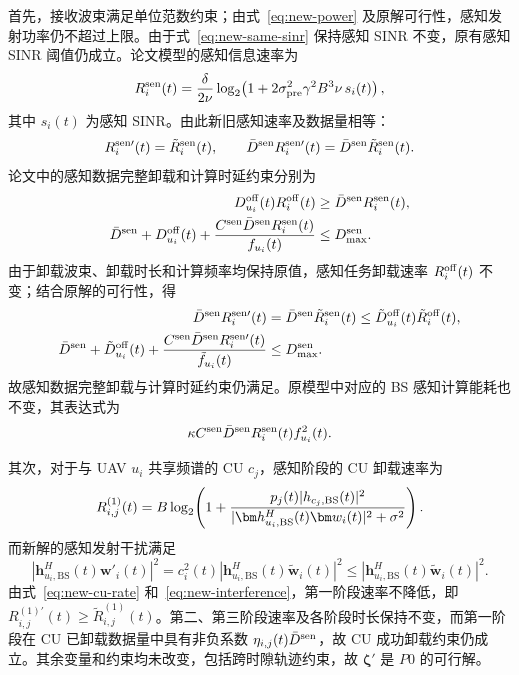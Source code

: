 首先，接收波束满足单位范数约束；由式~\eqref{eq:new-power} 及原解可行性，感知发射功率仍不超过上限。由于式~\eqref{eq:new-same-sinr} 保持感知 SINR 不变，原有感知 SINR 阈值仍成立。论文模型的感知信息速率为
\begin{equation}\label{eq:new-rate-formula}
R_i^{\rm sen}(t)=\frac{\delta}{2\nu}\log_2\!\left(1+2\sigma_{\rm pre}^2\gamma^2B^3\nu\,s_i(t)\right),
\end{equation}
其中 $s_i(t)$ 为感知 SINR。由此新旧感知速率及数据量相等：
\begin{equation}\label{eq:new-same-rate}
R_i^{\rm sen\prime}(t)=\tilde R_i^{\rm sen}(t),\qquad
\bar D^{\rm sen}R_i^{\rm sen\prime}(t)=\bar D^{\rm sen}\tilde R_i^{\rm sen}(t).
\end{equation}
论文中的感知数据完整卸载和计算时延约束分别为
\begin{align}\label{eq:new-model-off}
D_{u_i}^{\rm off}(t) R_i^{\rm off}(t)&\ge\bar D^{\rm sen}R_i^{\rm sen}(t),\\
\bar D^{\rm sen}+D_{u_i}^{\rm off}(t)+\frac{C^{\rm sen}\bar D^{\rm sen}R_i^{\rm sen}(t)}{f_{u_i}(t)}&\le D_{\max}^{\rm sen}.\label{eq:new-model-delay}
\end{align}
由于卸载波束、卸载时长和计算频率均保持原值，感知任务卸载速率 $R_i^{\rm off}(t)$ 不变；结合原解的可行性，得
\begin{align}
\bar D^{\rm sen}R_i^{\rm sen\prime}(t)&=\bar D^{\rm sen}\tilde R_i^{\rm sen}(t)\le\tilde D_{u_i}^{\rm off}(t)\tilde R_i^{\rm off}(t),\label{eq:new-off}\\
\bar D^{\rm sen}+\tilde D_{u_i}^{\rm off}(t)+\frac{C^{\rm sen}\bar D^{\rm sen}R_i^{\rm sen\prime}(t)}{\tilde f_{u_i}(t)}&\le D_{\max}^{\rm sen}.\label{eq:new-delay}
\end{align}
故感知数据完整卸载与计算时延约束仍满足。原模型中对应的 BS 感知计算能耗也不变，其表达式为
\[
\kappa C^{\rm sen}\bar D^{\rm sen}R_i^{\rm sen}(t) f_{u_i}^2(t).
\]

其次，对于与 UAV $u_i$ 共享频谱的 CU $c_j$，感知阶段的 CU 卸载速率为
\begin{equation}\label{eq:new-cu-rate}
R_{i,j}^{(1)}(t)=B\log_2\!\left(1+\frac{p_j(t)|h_{c_j,\rm BS}(t)|^2}{|\bm h_{u_i,\rm BS}^H(t)\bm w_i(t)|^2+\sigma^2}\right).
\end{equation}
而新解的感知发射干扰满足
\begin{equation}\label{eq:new-interference}
\left|\bm h_{u_i,\mathrm{BS}}^H(t)\bm w'_i(t)\right|^2=c_i^2(t)\left|\bm h_{u_i,\mathrm{BS}}^H(t)\tilde{\bm w}_i(t)\right|^2\le\left|\bm h_{u_i,\mathrm{BS}}^H(t)\tilde{\bm w}_i(t)\right|^2.
\end{equation}
由式~\eqref{eq:new-cu-rate} 和~\eqref{eq:new-interference}，第一阶段速率不降低，即 $R_{i,j}^{(1)\prime}(t)\ge\tilde R_{i,j}^{(1)}(t)$。第二、第三阶段速率及各阶段时长保持不变，而第一阶段在 CU 已卸载数据量中具有非负系数 $\eta_{i,j}(t)\bar D^{\rm sen}$，故 CU 成功卸载约束仍成立。其余变量和约束均未改变，包括跨时隙轨迹约束，故 $\bm\zeta'$ 是 $P0$ 的可行解。

